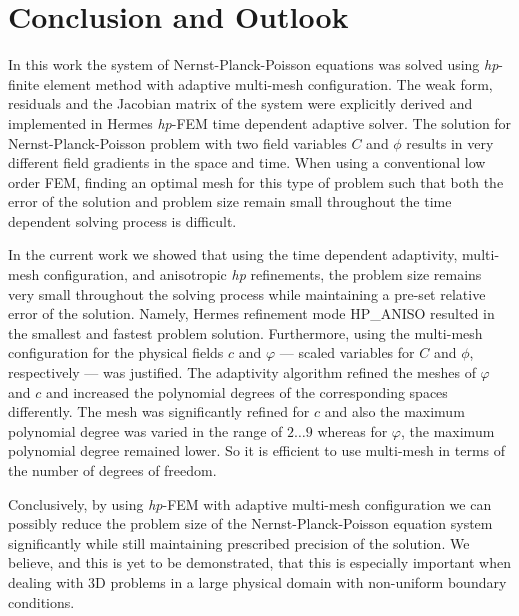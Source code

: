 \section{Conclusion and Outlook}\label{sec:conc}

In this work the system of Nernst-Planck-Poisson equations
was solved using \emph{hp}-finite element method with adaptive
multi-mesh configuration. The weak form, residuals and
the Jacobian matrix of the system were explicitly derived
and implemented in Hermes \emph{hp}-FEM time dependent
adaptive solver.
The solution for Nernst-Planck-Poisson
problem with two field variables $C$ and $\phi$ results in 
very different field gradients in the space and time.
When using a conventional low order
FEM, finding an optimal mesh for this
type of problem such that both the error of
the solution and problem size remain small throughout the
time dependent solving process is difficult. 

In the current work we showed that using the time dependent adaptivity, 
multi-mesh configuration, and anisotropic \emph{hp} refinements, the problem
size remains very small throughout the solving process while
maintaining a pre-set relative error of the solution.
Namely, Hermes refinement mode HP\_ANISO 
resulted in the smallest and fastest problem solution.
Furthermore, using the multi-mesh configuration for the physical fields
$c$ and $\varphi$ --- scaled variables for $C$ and $\phi$, respectively ---
was justified. The adaptivity algorithm
refined the meshes of $\varphi$  and $c$ and increased the
polynomial degrees of the corresponding spaces differently.
The mesh was significantly refined for $c$ and also the
maximum polynomial degree was varied in the range of
$2\ldots 9$ whereas for $\varphi$, the maximum polynomial degree
remained lower. So it is efficient to use multi-mesh in terms of
the number of degrees of freedom.

Conclusively, by using \emph{hp}-FEM with adaptive multi-mesh
configuration we can possibly reduce the problem size
of the Nernst-Planck-Poisson equation system significantly while
still maintaining prescribed precision of the solution. 
We believe, and this
is yet to be demonstrated, that this is especially
important when dealing with 3D problems in a large physical
domain with non-uniform boundary conditions.

